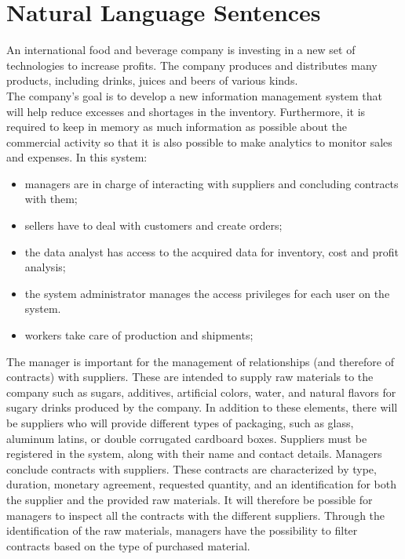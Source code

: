 \section{Natural Language Sentences}

An international food and beverage company is investing in a new set of technologies to increase profits. The company produces and distributes many products, including drinks, juices and beers of various kinds.\\

The company's goal is to develop a new information management system that will help reduce excesses and shortages in the inventory. Furthermore, it is required to keep in memory as much information as possible about the commercial activity so that it is also possible to make analytics to monitor sales and expenses. In this system:
\begin{itemize}
    \item managers are in charge of interacting with suppliers and concluding contracts with them;
    \item sellers have to deal with customers and create orders;
    \item the data analyst has access to the acquired data for inventory, cost and profit analysis;
    \item the system administrator manages the access privileges for each user on the system.
    \item workers take care of production and shipments;
\end{itemize}

The manager is important for the management of relationships (and therefore of contracts) with suppliers. These are intended to supply raw materials to the company such as sugars, additives, artificial colors, water, and natural flavors for sugary drinks produced by the company. In addition to these elements, there will be suppliers who will provide different types of packaging, such as glass, aluminum latins, or double corrugated cardboard boxes. Suppliers must be registered in the system, along with their name and contact details. Managers conclude contracts with suppliers. These contracts are characterized by type, duration, monetary agreement, requested quantity, and an identification for both the supplier and the provided raw materials. It will therefore be possible for managers to inspect all the contracts with the different suppliers. Through the identification of the raw materials, managers have the possibility to filter contracts based on the type of purchased material.\\

